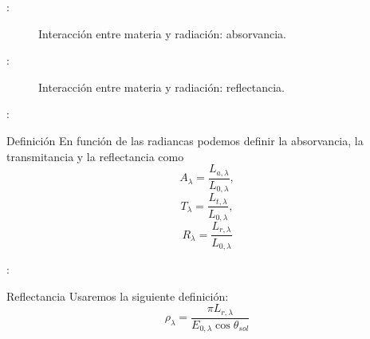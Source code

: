 \begin{frame}{\secname : \subsecname}
  \begin{figure}
    \centering
    \caption{Interacción entre materia y radiación: absorvancia.}
    \label{}
  \end{figure}
\end{frame}

\begin{frame}{\secname : \subsecname}
  \begin{figure}
    \centering
    \caption{Interacción entre materia y radiación: reflectancia.}
    \label{}
  \end{figure}
\end{frame}

\begin{frame}{\secname : \subsecname}
    \begin{block}{Definición}
        En función de las radiancas podemos definir la absorvancia, la transmitancia y la reflectancia como
        \begin{equation}
          A_\lambda = \frac{L_{a,\lambda}}{L_{0,\lambda}} ,
        \end{equation}
        \begin{equation}
          T_\lambda = \frac{L_{t,\lambda}}{L_{0,\lambda}} ,
        \end{equation}
        \begin{equation}
          R_\lambda = \frac{L_{r,\lambda}}{L_{0,\lambda}}
        \end{equation}
    \end{block}
\end{frame}

\begin{frame}{\secname : \subsecname}
    \begin{block}{Reflectancia}
        Usaremos la siguiente definición:
        \begin{equation}
          \rho_\lambda = \frac{\pi L_{r,\lambda}}{E_{0,\lambda} \cos \theta_{sol}}
        \end{equation}
    \end{block}
\end{frame}

